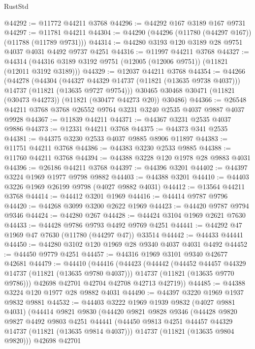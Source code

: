 \begin{lexlean}{RustStd}
\begin{coremodule}
@44292 := @11772 @44211 @3768
@44296 := @44292 @167 @3189 @167 @9731
@44297 := @11781 @44211
@44304 := @44290 (@44296 (@11780 (@44297 @167)) (@11788 (@11789 @9731)))
@44314 := @44280 @3193 @120 @3189 @28 @9751 @4037 @4031 @4492 @9737 @4251
@44316 := @11997 @44211 @3768
@44327 := @44314 (@44316 @3189 @3192 @9751 (@12005 (@12006 @9751)) (@11821 (@12011 @3192 @3189)))
@44329 := @12037 @44211 @3768
@44354 := @44266
    (@44278
      (@44304
        (@44327 @44329 @14737 (@11821 (@13635 @9738 @4037)))
        @14737
        (@11821 (@13635 @9727 @9754)))
      @30465
      @30468
      @30471
      (@11821 (@30473 @44273))
      (@11821 (@30477 @44273 @20))
      @30486)
@44366 := @26548 @44211 @3768 @3768 @26552 @9764 @3231 @3240 @2535 @4037 @9887 @4037 @9928
@44367 := @11839 @44211
@44371 := @44367 @3231 @2535 @4037 @9886
@44373 := @12331 @44211 @3768
@44375 := @44373 @341 @2535
@44381 := @44375 @3230 @2533 @4037 @9885 @8906 @11897
@44383 := @11751 @44211 @3768
@44386 := @44383 @3230 @2533 @9885
@44388 := @11760 @44211 @3768
@44394 := @44388 @3228 @120 @1978 @28 @9883 @4031
@44396 := @26186 @44211 @3768
@44397 := @44396 @3201
@44402 := @44397 @3224 @1969 @1977 @9798 @9882
@44403 := @44388 @3201
@44410 := @44403 @3226 @1969 @26199 @9798 (@4027 @9882 @4031)
@44412 := @13564 @44211 @3768
@44414 := @44412 @3201 @1969
@44416 := @44414 @9787 @9796
@44420 := @44268 @3099 @3200 @2622 @1969
@44423 := @44420 @9787 @9794 @9346
@44424 := @44280 @267
@44428 := @44424 @3104 @1969 @2621 @7630
@44433 := @44428 @9786 @9793 @4492 @9769 @4251
@44441 := @44292 @47 @1969 @47 @7630 (@11780 (@44297 @47)) @33514
@44442 := @44433 @44441
@44450 := @44280 @3102 @120 @1969 @28 @9340 @4037 @4031 @4492
@44452 := @44450 @9779 @4251
@44457 := @44316 @1969 @3101 @9340 @42677 @42681
@44479 := @44410
    (@44416
      (@44423
        (@44442
          (@44452 @44457 @44329 @14737 (@11821 (@13635 @9780 @4037)))
          @14737
          (@11821 (@13635 @9770 @9786)))
        @42698
        @42701
        @42704
        @42708
        @42713
        @42719))
@44485 := @44388 @3224 @120 @1977 @28 @9882 @4031
@44490 := @44397 @3220 @1969 @1937 @9832 @9881
@44532 := @44403
    @3222
    @1969
    @1939
    @9832
    (@4027 @9881 @4031)
    (@44414
      @9821
      @9830
      (@44420
        @9821
        @9828
        @9346
        (@44428
          @9820
          @9827
          @4492
          @9803
          @4251
          @44441
          (@44450 @9813 @4251 @44457 @44329 @14737 (@11821 (@13635 @9814 @4037)))
          @14737
          (@11821 (@13635 @9804 @9820)))
        @42698
        @42701

\end{coremodule}
\end{lexlean}
